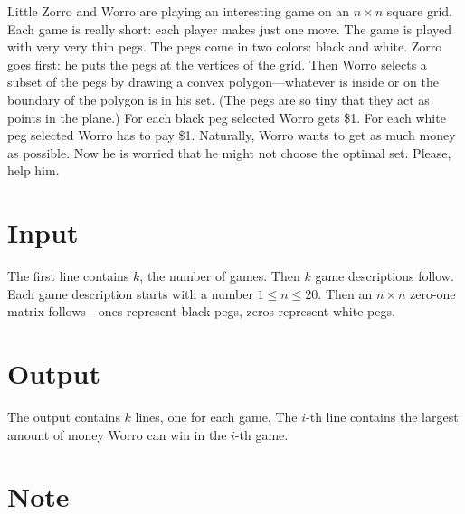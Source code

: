 
Little Zorro and Worro are playing an interesting game on an
$n\times n$ square grid. Each game is really short: each player makes just one move.
The game is played with very very thin
pegs. The pegs come in two colors: black and white. Zorro goes
first: he puts the pegs at the vertices of the grid. Then Worro
selects a subset of the pegs by drawing a convex
polygon---whatever is inside or on the boundary of the polygon is
in his set. (The pegs are so tiny that they act as points in the plane.)
For each black peg selected Worro gets \$1. For each
white peg selected Worro has to pay \$1. Naturally, Worro wants to
get as much money as possible. Now he is worried that he might not
choose the optimal set. Please, help him.

\section*{Input}
The first line contains $k$, the number of games. Then $k$ game
descriptions follow. Each game description starts with a number
$1\le n\le 20$. Then an $n\times n$ zero-one matrix
follows---ones represent black pegs, zeros represent white pegs.

\section*{Output}
The output contains $k$ lines, one for each game. The $i$-th line
contains the largest amount of money Worro can win in the $i$-th
game.

\section*{Note}

